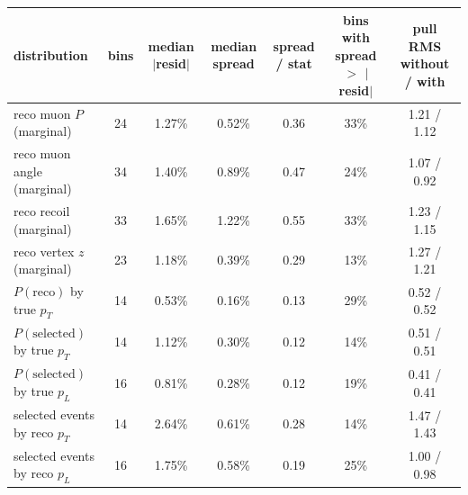 \begin{tabular}{lcccccc}
\toprule
distribution & bins & median $|$resid$|$ & median spread & spread / stat & bins with spread $>$ $|$resid$|$ & pull RMS without / with \\
\midrule
reco muon $P$ (marginal) & 24 & 1.27\% & 0.52\% & 0.36 & 33\% & 1.21 / 1.12 \\
reco muon angle (marginal) & 34 & 1.40\% & 0.89\% & 0.47 & 24\% & 1.07 / 0.92 \\
reco recoil (marginal) & 33 & 1.65\% & 1.22\% & 0.55 & 33\% & 1.23 / 1.15 \\
reco vertex $z$ (marginal) & 23 & 1.18\% & 0.39\% & 0.29 & 13\% & 1.27 / 1.21 \\
$P(\mathrm{reco})$ by true $p_T$ & 14 & 0.53\% & 0.16\% & 0.13 & 29\% & 0.52 / 0.52 \\
$P(\mathrm{selected})$ by true $p_T$ & 14 & 1.12\% & 0.30\% & 0.12 & 14\% & 0.51 / 0.51 \\
$P(\mathrm{selected})$ by true $p_L$ & 16 & 0.81\% & 0.28\% & 0.12 & 19\% & 0.41 / 0.41 \\
selected events by reco $p_T$ & 14 & 2.64\% & 0.61\% & 0.28 & 14\% & 1.47 / 1.43 \\
selected events by reco $p_L$ & 16 & 1.75\% & 0.58\% & 0.19 & 25\% & 1.00 / 0.98 \\
\bottomrule
\end{tabular}
